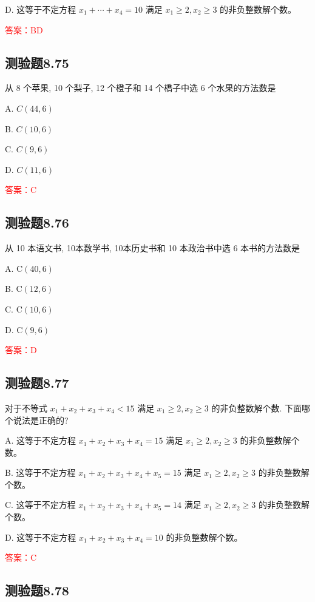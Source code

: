 \documentclass[UTF8, heading=true]{ctexart}
\begin{document}
D. 这等于不定方程 $x_1+\cdots+x_4=10$ 满足 $x_1 \geq 2, x_2 \geq 3$ 的非负整数解个数。

\textcolor{red}{答案：BD}

\subsection{测验题8.75}

从 8 个苹果, 10 个梨子, 12 个橙子和 14 个橋子中选 6 个水果的方法数是

A. $ C(44,6)$

B. $ C(10,6)$

C. $ C(9,6)$

D. $ C(11,6)$

\textcolor{red}{答案：C}


\subsection{测验题8.76}

从 10 本语文书, 10本数学书, 10本历史书和 10 本政治书中选 6 本书的方法数是

A. $\mathrm{C}(40,6)$

B. $\mathrm{C}(12,6)$

C. $\mathrm{C}(10,6)$

D. $\mathrm{C}(9,6)$

\textcolor{red}{答案：D}

\subsection{测验题8.77}

对于不等式 $x_1+x_2+x_3+x_4<15$ 满足 $x_1 \geq 2, x_2 \geq 3$ 的非负整数解个数. 下面哪个说法是正确的?

A. 这等于不定方程 $x_1+x_2+x_3+x_4=15$ 满足 $x_1 \geq 2, x_2 \geq 3$ 的非负整数解个数。

B. 这等于不定方程 $x_1+x_2+x_3+x_4+x_5=15$ 满足 $x_1 \geq 2, x_2 \geq 3$ 的非负整数解个数。

C. 这等于不定方程 $x_1+x_2+x_3+x_4+x_5=14$ 满足 $x_1 \geq 2, x_2 \geq 3$ 的非负整数解个数。

D. 这等于不定方程 $x_1+x_2+x_3+x_4=10$ 的非负整数解个数。

\textcolor{red}{答案：C}

\subsection{测验题8.78}
\end{document}
